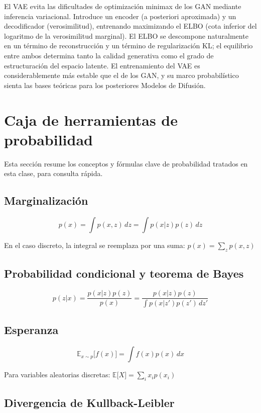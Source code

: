 \documentclass[a4paper]{article}
\begin{document}
El VAE evita las dificultades de optimización minimax de los GAN mediante inferencia variacional. Introduce un encoder (a posteriori aproximada) y un decodificador (verosimilitud), entrenando maximizando el ELBO (cota inferior del logaritmo de la verosimilitud marginal). El ELBO se descompone naturalmente en un término de reconstrucción y un término de regularización KL; el equilibrio entre ambos determina tanto la calidad generativa como el grado de estructuración del espacio latente. El entrenamiento del VAE es considerablemente más estable que el de los GAN, y su marco probabilístico sienta las bases teóricas para los posteriores Modelos de Difusión.

\newpage
\section{Caja de herramientas de probabilidad}

Esta sección resume los conceptos y fórmulas clave de probabilidad tratados en esta clase, para consulta rápida.

\subsection{Marginalización}

$$p(x) = \int p(x, z) \, dz = \int p(x|z) p(z) \, dz$$

En el caso discreto, la integral se reemplaza por una suma: $p(x) = \sum_z p(x, z)$

\subsection{Probabilidad condicional y teorema de Bayes}

$$p(z|x) = \frac{p(x|z) p(z)}{p(x)} = \frac{p(x|z) p(z)}{\int p(x|z') p(z') \, dz'}$$

\subsection{Esperanza}

$$\mathbb{E}_{x \sim p}{[}f(x){]} = \int f(x) p(x) \, dx$$

Para variables aleatorias discretas: $\mathbb{E}{[}X{]} = \sum_i x_i p(x_i)$

\subsection{Divergencia de Kullback-Leibler}
\end{document}
